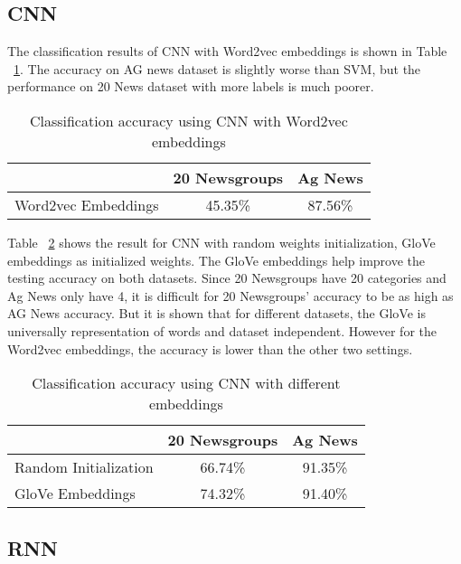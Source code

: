\documentclass{article}
\begin{document}
\subsection{CNN}
The classification results of CNN with Word2vec embeddings is shown in Table ~\ref{Tab2}. The accuracy on AG news dataset is slightly worse than SVM, but the performance on 20 News dataset with more labels is much poorer.
\begin{table}[h!]
  \begin{center}
    \begin{tabular}{ l | c | c }
      \hline
       & 20 Newsgroups & Ag News  \\ \hline
      Word2vec Embeddings & 45.35\%  & 87.56\% \\ \hline
    \end{tabular}
    \caption{\small Classification accuracy using CNN with Word2vec embeddings}
    \label{Tab2}
  \end{center}
\end{table}

Table ~\ref{Tab3} shows the result for CNN with random weights initialization, GloVe embeddings as initialized weights. The GloVe embeddings help improve the testing accuracy on both datasets. Since 20 Newsgroups have 20 categories and Ag News only have 4, it is difficult for 20 Newsgroups’ accuracy to be as high as AG News accuracy. But it is shown that for different datasets, the GloVe is universally representation of words and dataset independent. However for the Word2vec embeddings, the accuracy is lower than the other two settings.

\begin{table}[h!]
  \begin{center}
    \begin{tabular}{ l | c | c }
      \hline
       & 20 Newsgroups & Ag News  \\ \hline
      Random Initialization & 66.74\% &  91.35\%  \\ \hline
      GloVe Embeddings & 74.32\%  & 91.40\% \\ \hline
    \end{tabular}
    \caption{\small Classification accuracy using CNN with different embeddings}
    \label{Tab3}
  \end{center}
\end{table}

\subsection{RNN}
\end{document}
